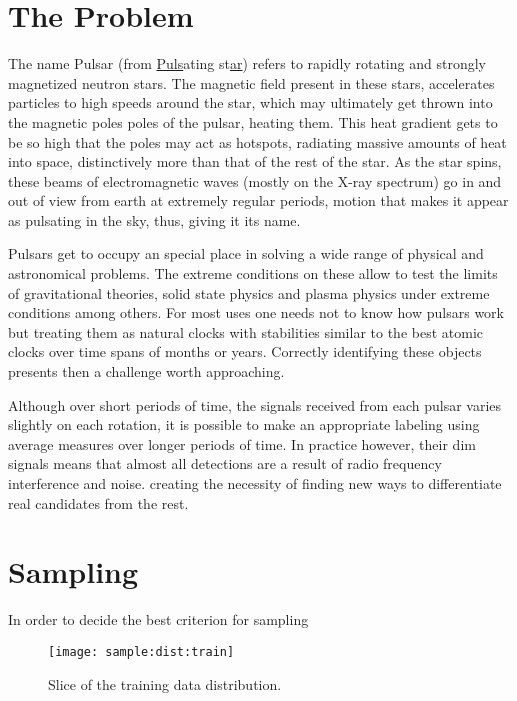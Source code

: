 \documentclass[conference]{IEEEtran}
\begin{document}
\section{The Problem}
The name Pulsar (from \underline{Puls}ating st\underline{ar}) refers to rapidly
rotating and strongly magnetized neutron stars.\cite{pulsar:definition:nasa}
The magnetic field present in these stars, accelerates particles to high
speeds around the star, which may ultimately get thrown into the magnetic
poles poles of the pulsar, heating them. This heat gradient gets to be so high
that the poles may act as hotspots, radiating massive amounts of heat into space,
distinctively more than that of the rest of the star. As the star spins,
these beams of electromagnetic waves (mostly on the X-ray spectrum) go in and out
of view from earth at extremely regular periods, motion that makes it appear as
pulsating in the sky, thus, giving it its name.

Pulsars get to occupy an special place in solving a wide range of physical and
astronomical problems.\cite{pulsar:importance:kramer} The extreme conditions on
these allow to test the limits of gravitational theories, solid state physics and
plasma physics under extreme conditions among others. For most uses one needs
not to know how pulsars work but treating them as natural clocks with stabilities
similar to the best atomic clocks over time spans of months or years. 
Correctly identifying these objects presents then a challenge worth approaching.

Although over short periods of time, the signals received from each pulsar
varies slightly on each rotation,\cite{pulsar:importance:kramer} it is possible
to make an appropriate labeling using average measures over longer periods of time.
In practice however, their dim signals means that almost all detections are a
result of radio frequency interference and noise\cite{pulsar:dataset:explanation:lyon}.
creating the necessity of finding new ways to differentiate real candidates
from the rest.

\section{Sampling}

In order to decide the best criterion for sampling


\begin{figure}[h]
    \texttt{[image: sample:dist:train]}
    \caption{Slice of the training data distribution. \label{fig:sample:dist:train}}
\end{figure}
\end{document}
